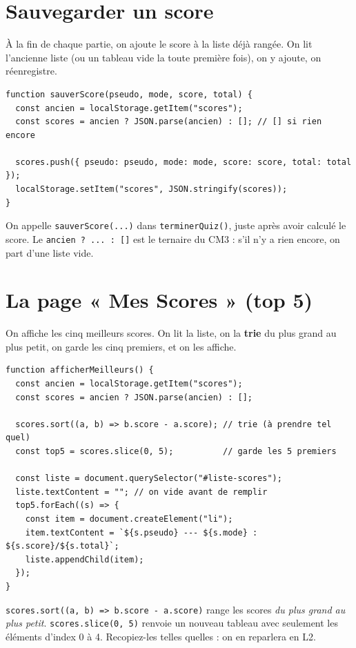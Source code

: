 \documentclass[11pt,a4paper]{article}
\newcommand{\code}[1]{\texttt{#1}}
\begin{document}
\section{Sauvegarder un score}

À la fin de chaque partie, on ajoute le score à la liste déjà rangée. On lit l'ancienne liste (ou un tableau vide la toute première fois), on y ajoute, on réenregistre.

\begin{lstlisting}[style=js]
function sauverScore(pseudo, mode, score, total) {
  const ancien = localStorage.getItem("scores");
  const scores = ancien ? JSON.parse(ancien) : []; // [] si rien encore

  scores.push({ pseudo: pseudo, mode: mode, score: score, total: total });
  localStorage.setItem("scores", JSON.stringify(scores));
}
\end{lstlisting}

On appelle \code{sauverScore(...)} dans \code{terminerQuiz()}, juste après avoir calculé le score. Le \code{ancien ? ... : []} est le ternaire du CM3 : s'il n'y a rien encore, on part d'une liste vide.

\section{La page « Mes Scores » (top 5)}

On affiche les cinq meilleurs scores. On lit la liste, on la \textbf{trie} du plus grand au plus petit, on garde les cinq premiers, et on les affiche.

\begin{lstlisting}[style=js]
function afficherMeilleurs() {
  const ancien = localStorage.getItem("scores");
  const scores = ancien ? JSON.parse(ancien) : [];

  scores.sort((a, b) => b.score - a.score); // trie (à prendre tel quel)
  const top5 = scores.slice(0, 5);          // garde les 5 premiers

  const liste = document.querySelector("#liste-scores");
  liste.textContent = ""; // on vide avant de remplir
  top5.forEach((s) => {
    const item = document.createElement("li");
    item.textContent = `${s.pseudo} --- ${s.mode} : ${s.score}/${s.total}`;
    liste.appendChild(item);
  });
}
\end{lstlisting}

\begin{infobox}
\code{scores.sort((a, b) => b.score - a.score)} range les scores \emph{du plus grand au plus petit}. \code{scores.slice(0, 5)} renvoie un nouveau tableau avec seulement les éléments d'index 0 à 4. Recopiez-les telles quelles : on en reparlera en L2.
\end{infobox}
\end{document}
